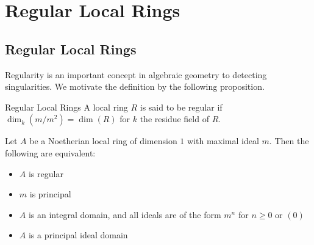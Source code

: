 \documentclass[a4paper]{article}
\begin{document}
\pagebreak
\section{Regular Local Rings}
\subsection{Regular Local Rings}
Regularity is an important concept in algebraic geometry to detecting singularities. We motivate the definition by the following proposition. 

\begin{defn}{Regular Local Rings}{} A local ring $R$ is said to be regular if $\dim_k(m/m^2)=\dim(R)$ for $k$ the residue field of $R$. 
\end{defn}

\begin{thm}{}{} Let $A$ be a Noetherian local ring of dimension $1$ with maximal ideal $m$. Then the following are equivalent: 
\begin{itemize}
\item $A$ is regular
\item $m$ is principal
\item $A$ is an integral domain, and all ideals are of the form $m^n$ for $n\geq 0$ or $(0)$
\item $A$ is a principal ideal domain
\end{itemize}
\end{thm}
\end{document}
